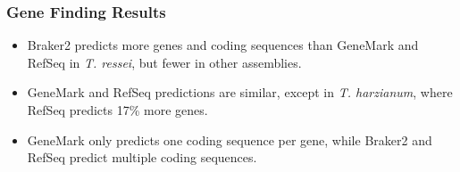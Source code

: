 \documentclass[t]{beamer}
\begin{document}
\begin{frame}
	\frametitle{Gene Finding Results}
	\centering
	\begin{itemize}
		\item Braker2 predicts more genes and coding sequences than GeneMark and RefSeq in \textit{T. ressei}, but fewer in other assemblies.
		\item GeneMark and RefSeq predictions are similar, except in \textit{T. harzianum}, where RefSeq predicts 17\% more genes.
		\item GeneMark only predicts one coding sequence per gene, while Braker2 and RefSeq predict multiple coding sequences.
	\end{itemize}
\end{frame}
\end{document}
